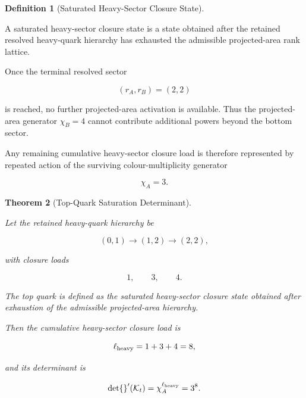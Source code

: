\documentclass[11pt]{article}
\newtheorem{theorem}{Theorem}[section]
\theoremstyle{definition}
\newtheorem{definition}[theorem]{Definition}
\theoremstyle{remark}
\begin{document}
\begin{definition}[Saturated Heavy-Sector Closure State]
\label{def:saturated_heavy_sector_closure_state}

A saturated heavy-sector closure state is a state obtained after
the retained resolved heavy-quark hierarchy has exhausted the
admissible projected-area rank lattice.

Once the terminal resolved sector

\begin{equation}
(r_A,r_B)=(2,2)
\end{equation}

is reached, no further projected-area activation is available.
Thus the projected-area generator \(\chi_B=4\) cannot contribute
additional powers beyond the bottom sector.

Any remaining cumulative heavy-sector closure load is therefore
represented by repeated action of the surviving
colour-multiplicity generator

\begin{equation}
\chi_A=3.
\end{equation}

\end{definition}

\begin{theorem}[Top-Quark Saturation Determinant]
\label{thm:top_quark_saturation_determinant}

Let the retained heavy-quark hierarchy be

\begin{equation}
(0,1)
\longrightarrow
(1,2)
\longrightarrow
(2,2),
\end{equation}

with closure loads

\begin{equation}
1,
\qquad
3,
\qquad
4.
\end{equation}

The top quark is defined as the saturated heavy-sector closure
state obtained after exhaustion of the admissible projected-area
hierarchy.

Then the cumulative heavy-sector closure load is

\begin{equation}
\ell_{\rm heavy}
=
1+3+4
=
8,
\end{equation}

and its determinant is

\begin{equation}
\det{}'(\mathcal K_t)
=
\chi_A^{\ell_{\rm heavy}}
=
3^8.
\end{equation}

\end{theorem}
\end{document}
